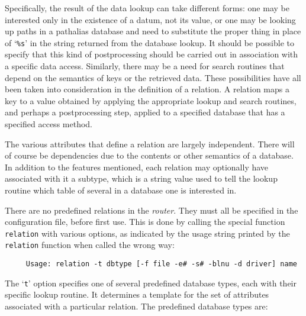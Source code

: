 Specifically, the result of the data lookup can take different forms: one
may be interested only in the existence of a datum, not its value, or one
may be looking up paths in a pathalias database and need to substitute the
proper thing in place of `{\tt \%s}' in the string returned from the database
lookup.  It should be possible to specify that this kind of postprocessing
should be carried out in association with a specific data access.
Similarly, there may be a need for search routines that depend on the
semantics of keys or the retrieved data.  These possibilities have all been
taken into consideration in the definition of a relation.  A relation maps
a key to a value obtained by applying the appropriate lookup and search
routines, and perhaps a postprocessing step, applied to a specified
database that has a specified access method.

The various attributes that define a relation are largely independent.
There will of course be dependencies due to the contents or other semantics
of a database.  In addition to the features mentioned, each relation may
optionally have associated with it a subtype, which is a string value used
to tell the lookup routine which table of several in a database
one is interested in.

There are no predefined relations in the {\em router\/}.  They must all be
specified in the configuration file, before first use.  This is done by
calling the special function {\tt relation} with various options, as indicated
by the usage string printed by the {\tt relation} function when called the wrong
way:

\begin{verbatim}
     Usage: relation -t dbtype [-f file -e# -s# -blnu -d driver] name
\end{verbatim}


The `{\tt t}' option specifies one of several predefined database types, each
with their specific lookup routine.  It determines a template for the set
of attributes associated with a particular relation.  The predefined
database types are:



